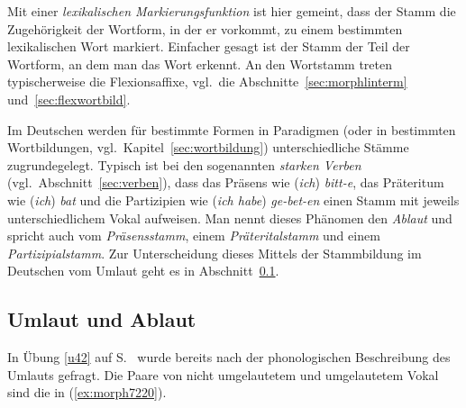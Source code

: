 

Mit einer \textit{lexikalischen Markierungsfunktion} ist hier gemeint, dass der Stamm die Zugehörigkeit der Wortform, in der er vorkommt, zu einem bestimmten lexikalischen Wort markiert.
Einfacher gesagt ist der Stamm der Teil der Wortform, an dem man das Wort erkennt.
An den Wortstamm treten typischerweise die Flexionsaffixe, vgl.\ die Abschnitte~\ref{sec:morphlinterm} und~\ref{sec:flexwortbild}.

Im Deutschen werden für bestimmte Formen in Paradigmen (oder in bestimmten Wortbildungen, vgl.\ Kapitel~\ref{sec:wortbildung}) unterschiedliche Stämme zugrundegelegt.
Typisch ist \zB bei den sogenannten \textit{starken Verben} (vgl.\ Abschnitt~\ref{sec:verben}), dass das Präsens wie (\textit{ich}) \textit{bitt-e}, das Präteritum wie (\textit{ich}) \textit{bat} und die Partizipien wie (\textit{ich habe}) \textit{ge-bet-en} einen Stamm mit jeweils unterschiedlichem Vokal aufweisen.
Man nennt dieses Phänomen den \textit{Ablaut} und spricht auch vom \textit{Präsensstamm}, einem \textit{Präteritalstamm} und einem \textit{Partizipialstamm}.
Zur Unterscheidung dieses Mittels der Stammbildung im Deutschen vom Umlaut geht es in Abschnitt~\ref{sec:umablaut}.

\subsection{Umlaut und Ablaut}

\label{sec:umablaut}

In Übung \ref{u42} auf S.~\pageref{u42} wurde bereits nach der phonologischen Beschreibung des Umlauts gefragt.
Die Paare von nicht umgelautetem und umgelautetem Vokal sind die in (\ref{ex:morph7220}).

\begin{exe}
  \ex\label{ex:morph7220}
  \begin{xlist}
  \end{xlist}
\end{exe}

